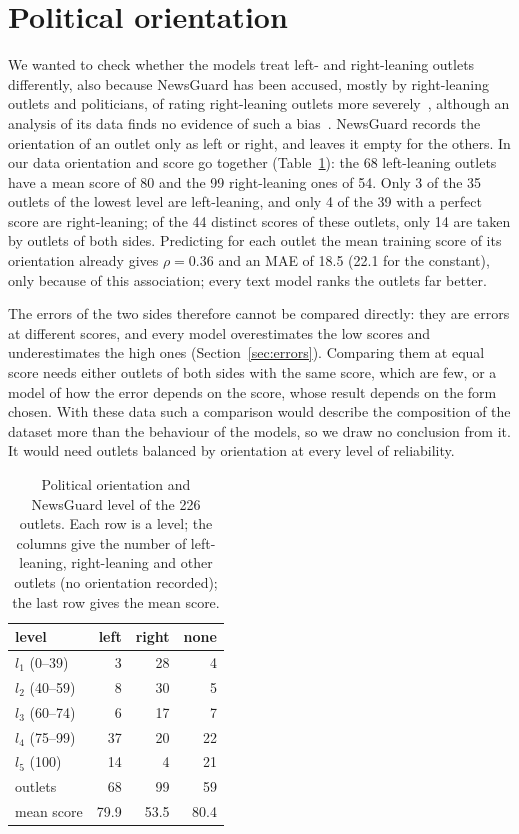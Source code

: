 \documentclass[11pt,a4paper]{article}
\begin{document}
\section{Political orientation}\label{app:orientation}
We wanted to check whether the models treat left- and right-leaning outlets differently, also because NewsGuard has
been accused, mostly by right-leaning outlets and politicians, of rating right-leaning outlets more
severely~\cite{oremus2024newsguard}, although an analysis of its data finds no evidence of such a
bias~\cite{luhring2025best}. NewsGuard records the orientation of an outlet only as left or right, and leaves it empty
for the others. In our data orientation and score go together (Table~\ref{tab:orientation}): the 68 left-leaning
outlets have a mean score of 80 and the 99 right-leaning ones of 54. Only 3 of the 35 outlets of the lowest level are
left-leaning, and only 4 of the 39 with a perfect score are right-leaning; of the 44 distinct scores of these outlets,
only 14 are taken by outlets of both sides. Predicting for each outlet the mean training score of its orientation
already gives $\rho = 0.36$ and an MAE of 18.5 (22.1 for the constant), only because of this association; every text
model ranks the outlets far better.

The errors of the two sides therefore cannot be compared directly: they are errors at different scores, and every model
overestimates the low scores and underestimates the high ones (Section~\ref{sec:errors}). Comparing them at equal
score needs either outlets of both sides with the same score, which are few, or a model of how the error depends on the
score, whose result depends on the form chosen. With these data such a comparison would describe the composition of the
dataset more than the behaviour of the models, so we draw no conclusion from it. It would need outlets balanced by
orientation at every level of reliability.

\begin{table}[h]
\centering
\caption{Political orientation and NewsGuard level of the 226 outlets. Each row is a level; the columns give the number
of left-leaning, right-leaning and other outlets (no orientation recorded); the last row gives the mean score.}\label{tab:orientation}
\begin{tabular}{lrrr}
\toprule
level & left & right & none \\
\midrule
$l_1$ (0--39) & 3 & 28 & 4 \\
$l_2$ (40--59) & 8 & 30 & 5 \\
$l_3$ (60--74) & 6 & 17 & 7 \\
$l_4$ (75--99) & 37 & 20 & 22 \\
$l_5$ (100) & 14 & 4 & 21 \\
\midrule
outlets & 68 & 99 & 59 \\
mean score & 79.9 & 53.5 & 80.4 \\
\bottomrule
\end{tabular}
\end{table}



\end{document}
